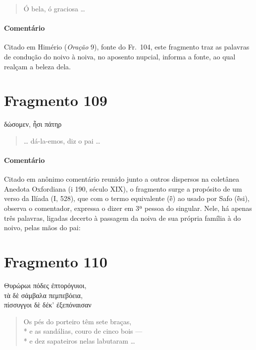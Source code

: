 {\begin{verse}
Ó bela, ó graciosa \ldots{}
\end{verse}

{\paragraph{Comentário} Citado em Himério (\textit{Oração} 9), fonte do Fr.~104, este fragmento traz as palavras de condução do noivo à noiva, no aposento nupcial, informa a fonte, ao qual realçam a beleza dela.}


\pagebreak
\section{Fragmento 109 }

\begin{gkverse}
δώσομεν, ἦσι πάτηρ
\end{gkverse}

\begin{verse}
\ldots{} dá-la-emos, diz o pai \ldots{}
\end{verse}

\paragraph{Comentário} Citado em anônimo comentário reunido junto a outros dispersos na coletânea Anedota Oxfordiana (i 190, século XIX), o fragmento surge a propósito de um verso da Ilíada (I, 528), que com o termo equivalente (ē̂) ao usado por Safo (ē̂si), observa o comentador, expressa o dizer em 3ª pessoa do singular. Nele, há apenas três palavras, ligadas decerto à passagem da noiva de sua própria família à do noivo, pelas mãos do pai:


\section{Fragmento 110}

\begin{gkverse}
Θυρώρωι πόδες ἐπτορόγυιοι,\\
τὰ δὲ σάμβαλα πεμπεβόεια,\\
πίσσυγγοι δὲ δέκ’ ἐξεπόναισαν
\end{gkverse}

\begin{verse}
Os pés do porteiro têm sete braças,\\*
e as sandálias, couro de cinco bois --- \\*
e dez sapateiros nelas labutaram \ldots{}
\end{verse}

}

